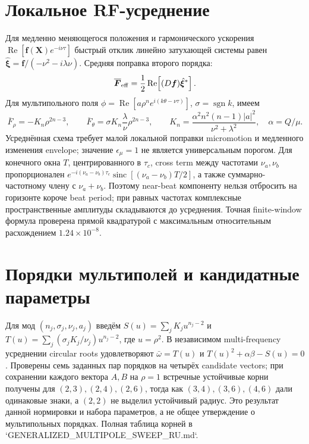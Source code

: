 \documentclass[11pt,a4paper]{article}
\begin{document}
\section{Локальное RF-усреднение}
Для медленно меняющегося положения и гармонического ускорения \(\operatorname{Re}[\bm f(\bm X)e^{-i\nu\tau}]\) быстрый отклик линейно затухающей системы равен \(\hat{\bm\xi}=\bm f/(-\nu^2-i\lambda\nu)\). Средняя поправка второго порядка:
\begin{equation}
\overline{\bm F}_{\rm eff}=\frac12\operatorname{Re}\!\left[(D\bm f)\hat{\bm\xi}^{*}\right].
\end{equation}
Для мультипольного поля \(\phi=\operatorname{Re}[a\rho^ne^{i(k\theta-\nu\tau)}]\), \(\sigma=\operatorname{sgn}k\), имеем
\begin{equation}
\overline F_\rho=-K_n\rho^{2n-3},\qquad
\overline F_\theta=\sigma K_n\frac{\lambda}{\nu}\rho^{2n-3},\qquad
K_n=\frac{\alpha^2n^2(n-1)|a|^2}{\nu^2+\lambda^2},\quad \alpha=Q/\mu.
\end{equation}
Усреднённая схема требует малой локальной поправки micromotion и медленного изменения envelope; значение \(\epsilon_\mu=1\) не является универсальным порогом.
Для конечного окна \(T\), центрированного в \(\tau_c\), cross term между частотами \(\nu_a,\nu_b\) пропорционален \(e^{-i(\nu_a-\nu_b)\tau_c}\operatorname{sinc}[(\nu_a-\nu_b)T/2]\), а также суммарно-частотному члену с \(\nu_a+\nu_b\). Поэтому near-beat компоненту нельзя отбросить на горизонте короче beat period; при равных частотах комплексные пространственные амплитуды складываются до усреднения. Точная finite-window формула проверена прямой квадратурой с максимальным относительным расхождением \(1.24\times10^{-8}\).

\section{Порядки мультиполей и кандидатные параметры}
Для мод \((n_j,\sigma_j,\nu_j,a_j)\) введём \(S(u)=\sum_jK_ju^{n_j-2}\) и \(T(u)=\sum_j(\sigma_jK_j/\nu_j)u^{n_j-2}\), где \(u=\rho^2\). В независимом multi-frequency усреднении circular roots удовлетворяют \(\bar\omega=T(u)\) и \(T(u)^2+\alpha\beta-S(u)=0\). Проверены семь заданных пар порядков на четырёх candidate vectors; при сохранении каждого вектора \(A,B\) на \(\rho=1\) встречные устойчивые корни получены для \((2,3),(2,4),(2,6)\), тогда как \((3,4),(3,6),(4,6)\) дали одинаковые знаки, а \((2,2)\) не выделил устойчивый радиус. Это результат данной нормировки и набора параметров, а не общее утверждение о мультипольных порядках. Полная таблица корней в `GENERALIZED_MULTIPOLE_SWEEP_RU.md`.
\end{document}
